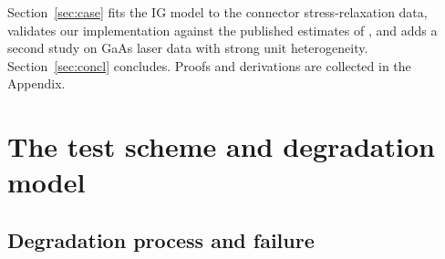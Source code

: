 \documentclass[11pt]{article}
\begin{document}
Section~\ref{sec:case} fits the IG model to the connector stress-relaxation data, validates
our implementation against the published estimates of \citet{Ma2021}, and adds a second study
on GaAs laser data with strong unit heterogeneity. Section~\ref{sec:concl} concludes. Proofs
and derivations are collected in the Appendix.

\section{The test scheme and degradation model}\label{sec:model}

\subsection{Degradation process and failure}
\end{document}
